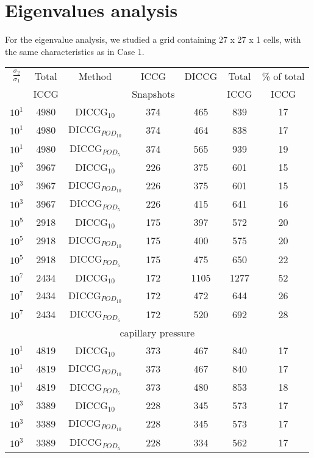\documentclass[12pt]{article}
\begin{document}
\section*{Eigenvalues analysis}
For the eigenvalue analysis, we studied a grid containing 27 x 27 x 1 cells, with the same characteristics as in Case 1.
\begin{table}[!ht]\centering
\begin{minipage}{1\textwidth}
 \centering
\begin{tabular}{ ||c|c||c|c|c|c|c||} 
\hline
$\frac{\sigma_2}{\sigma_1}$&Total&Method  & ICCG&DICCG &Total&\% of total\\ 
                           & ICCG     &  & Snapshots& &ICCG& ICCG\\ 
\hline 
$10^{1}$ &4980& DICCG$_{10}$&374&465&839&17\\ 
\hline  
$10^{1}$ &4980& DICCG$_{POD_{10}}$&374&464&838&17 \\ 
\hline  
$10^{1}$ &4980& DICCG$_{POD_{5}}$&374&565&939&19 \\ 
\hline  
$10^{3}$ &3967& DICCG$_{10}$&226&375&601&15\\ 
\hline  
$10^{3}$ &3967& DICCG$_{POD_{10}}$&226&375&601&15 \\ 
\hline  
$10^{3}$ &3967& DICCG$_{POD_{5}}$&226&415&641&16 \\ 
\hline 
$10^{5}$ &2918& DICCG$_{10}$&175&397&572&20\\ 
\hline  
$10^{5}$ &2918& DICCG$_{POD_{10}}$&175&400&575&20 \\ 
\hline  
$10^{5}$ &2918& DICCG$_{POD_{5}}$&175&475&650&22 \\ 
\hline 
$10^{7}$ &2434& DICCG$_{10}$&172&1105&1277&52\\ 
\hline  
$10^{7}$ &2434& DICCG$_{POD_{10}}$&172&472&644&26 \\ 
\hline  
$10^{7}$ &2434& DICCG$_{POD_{5}}$&172&520&692&28 \\ 
\hline  
\multicolumn{7}{|c|}{capillary pressure}\\
\hline 
$10^{1}$ &4819& DICCG$_{10}$&373&467&840&17\\ 
\hline  
$10^{1}$ &4819& DICCG$_{POD_{10}}$&373&467&840&17 \\ 
\hline  
$10^{1}$ &4819& DICCG$_{POD_{5}}$&373&480&853&18 \\ 
\hline 
$10^{3}$ &3389& DICCG$_{10}$&228&345&573&17\\ 
\hline  
$10^{3}$ &3389& DICCG$_{POD_{10}}$&228&345&573&17 \\ 
\hline  
$10^{3}$ &3389& DICCG$_{POD_{5}}$&228&334&562&17 \\ 

\end{tabular}
\end{minipage}
\end{table}
\end{document}
